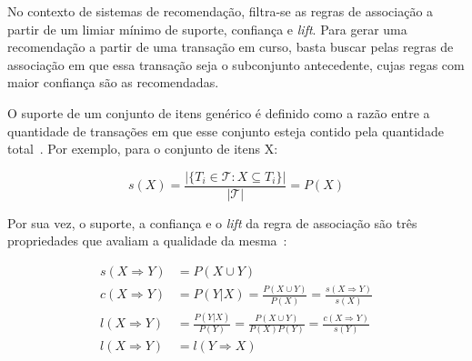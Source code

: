     

No contexto de sistemas de recomendação, filtra-se as regras de associação a
partir de um limiar mínimo de suporte, confiança e \textit{lift}. Para gerar uma
recomendação a partir de uma transação em curso, basta buscar pelas regras de
associação em que essa transação seja o subconjunto antecedente, cujas regas com
maior confiança são as recomendadas.


O suporte de um conjunto de itens genérico é definido como a razão entre a
quantidade de transações em que esse conjunto esteja contido pela quantidade
total~\cite{larose2014discovering}. Por exemplo, para o conjunto de itens X:

\begin{equation}
s(X) = \frac{|\{T_i \in \mathcal{T} : X \subseteq T_i\}|}{|\mathcal{T}|} = P(X)
\end{equation}

Por sua vez, o suporte, a confiança e o \textit{lift} da regra de associação são três
propriedades que avaliam a qualidade da mesma~\cite{larose2014discovering}:

\begin{align}
    s(X \Rightarrow Y) &= P( X \cup Y ) \\
    c(X \Rightarrow Y) &= P(Y|X) = \frac{P(X \cup Y)}{P(X)} = \frac{s(X \Rightarrow Y)}{s(X)}  \\
    l(X \Rightarrow Y) &= \frac{P(Y|X)}{P(Y)} = \frac{P(X \cup Y)}{P(X)P(Y)} = \frac{c(X \Rightarrow Y)}{s(Y)}\\
    l(X \Rightarrow Y) &= l(Y \Rightarrow X) 
\end{align}

